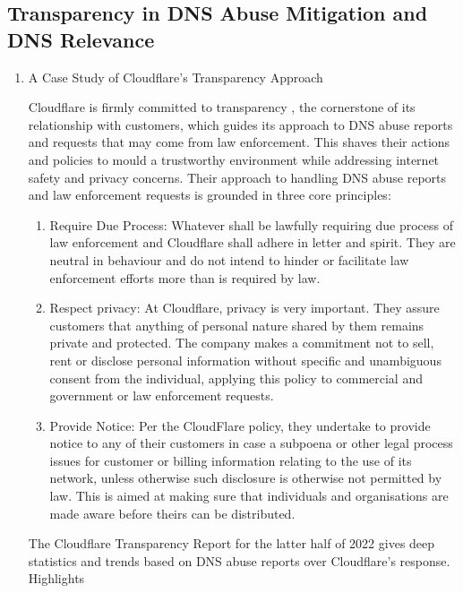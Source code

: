 \subsection{Transparency in DNS Abuse Mitigation and DNS Relevance}

\begin{enumerate}
    \item A Case Study of Cloudflare's Transparency Approach


Cloudflare is firmly committed to transparency \cite{cloudflare_transparency_2022}, the cornerstone of its relationship with customers, which guides its approach to DNS abuse reports and requests that may come from law enforcement. This shaves their actions and policies to mould a trustworthy environment while addressing internet safety and privacy concerns. Their approach to handling DNS abuse reports and law enforcement requests is grounded in three core principles:

\begin{enumerate}
    \item Require Due Process:  Whatever shall be lawfully requiring due process of law enforcement and Cloudflare shall adhere in letter and spirit. They are neutral in behaviour and do not intend to hinder or facilitate law enforcement efforts more than is required by law.
    \item Respect privacy: At Cloudflare, privacy is very important. They assure customers that anything of personal nature shared by them remains private and protected. The company makes a commitment not to sell, rent or disclose personal information without specific and unambiguous consent from the individual, applying this policy to commercial and government or law enforcement requests.
    \item Provide Notice: Per the CloudFlare policy, they undertake to provide notice to any of their customers in case a subpoena or other legal process issues for customer or billing information relating to the use of its network, unless otherwise such disclosure is otherwise not permitted by law. This is aimed at making sure that individuals and organisations are made aware before theirs can be distributed.
\end{enumerate}

The Cloudflare Transparency Report for the latter half of 2022 gives deep statistics and trends based on DNS abuse reports over Cloudflare's response. Highlights


\end{enumerate}
